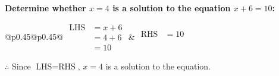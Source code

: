 \documentclass[12pt, varwidth, border=5mm]{standalone}
\begin{document}
    \noindent \textbf{Determine whether \(x = 4\) is a solution to the equation \(x + 6 = 10\):}
\vspace{2pt}  %

\noindent
\renewcommand{\arraystretch}{1.3} %
\begin{tabular}{@{}p{0.45\linewidth}@{}p{0.45\linewidth}@{}}
    \(\begin{aligned}
        \text{LHS} &= x + 6 \\
                   &= 4 + 6 \\
                   &= 10
    \end{aligned}\) &
    \(\begin{aligned}
        \text{RHS} &= 10\\
                   & \\
                   &
    \end{aligned}\)
\end{tabular}
\renewcommand{\arraystretch}{1.0} %
\vspace{2pt}  %

\noindent \(\therefore\) Since \(\text{LHS} = \text{RHS}\), \(x = 4\) is  a solution to the equation.
\end{document}
